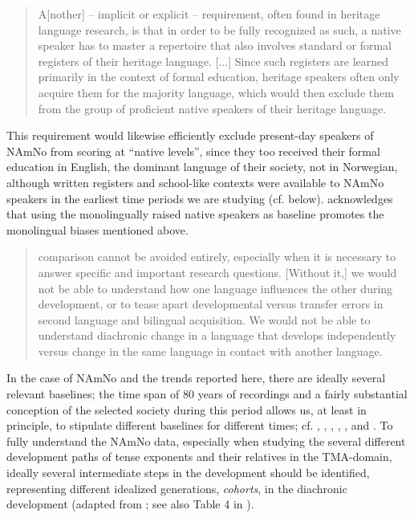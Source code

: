 \documentclass[output=paper]{langscibook}
\begin{document}
\begin{quote}
A[nother] – implicit or explicit – requirement, often found in heritage language research, is that in order to be fully recognized as such, a native speaker has to master a repertoire that also involves standard or formal registers of their heritage language. [...] Since such registers are learned primarily in the context of formal education, heritage speakers often only acquire them for the majority language, which would then exclude them from the group of proficient native speakers of their heritage language. 
\end{quote}

This requirement would likewise efficiently exclude present-day speakers of NAmNo from scoring at “native levels”, since they too received their formal education in English, the dominant language of their society, not in Norwegian, although written registers and school-like contexts were available to NAmNo speakers in the earliest time periods we are studying (cf. below). \citet[174ff.]{Montrul2016} acknowledges that using the monolingually raised native speakers as baseline promotes the monolingual biases mentioned above. 

\begin{quote} comparison cannot be avoided entirely, especially when it is necessary to answer specific and important research questions. [Without it,] we would not be able to understand how one language influences the other during development, or to tease apart developmental versus transfer errors in second language and bilingual acquisition. We would not be able to understand diachronic change in a language that develops independently versus change in the same language in contact with another language. 
\end{quote}

In the case of NAmNo and the trends reported here, there are ideally several relevant baselines; the time span of 80 years of recordings and a fairly substantial conception of the selected society during this period allows us, at least in principle, to stipulate different baselines for different times; cf. \citet{LarssonJohannessen2015Incomplete}, \citet{Lykke2020}, \citet{vanBaal2022New}, \citet{EikLaanemets2021}, \citet{KinnLarsson2022}, and \citet{EideHjelde2023,EideHjeldeForthcoming}. To fully understand the NAmNo data, especially when studying the several different development paths of tense exponents and their relatives in the TMA-domain, ideally several intermediate steps in the development should be identified, representing different idealized generations, \textit{cohorts}, in the diachronic development (adapted from \citealt{EideHjelde2023}; see also Table 4 in ).
\end{document}
